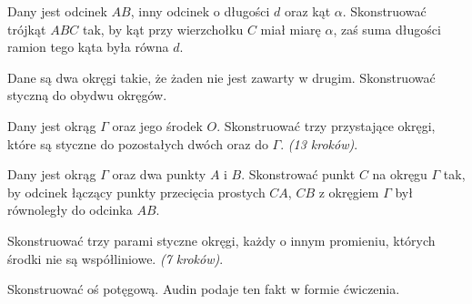 \begin{problem}
    Dany jest odcinek $AB$, inny odcinek o długości $d$ oraz kąt $\alpha$.
    Skonstruować trójkąt $ABC$ tak, by kąt przy wierzchołku $C$ miał miarę $\alpha$, zaś suma długości ramion tego kąta była równa $d$.
\end{problem} %

\begin{problem}
    Dane są dwa okręgi takie, że żaden nie jest zawarty w drugim.
    Skonstruować styczną do obydwu okręgów.
\end{problem}

\begin{problem}
    Dany jest okrąg $\Gamma$ oraz jego środek $O$.
    Skonstruować trzy przystające okręgi, które są styczne do pozostałych dwóch oraz do $\Gamma$. \hfill \emph{(13 kroków)}. %
\end{problem}

\begin{problem}
    Dany jest okrąg $\Gamma$ oraz dwa punkty $A$ i $B$.
    Skonstrować punkt $C$ na okręgu $\Gamma$ tak, by odcinek łączący punkty przecięcia prostych $CA$, $CB$ z okręgiem $\Gamma$ był równoległy do odcinka $AB$.
\end{problem}

\begin{problem}
    Skonstruować trzy parami styczne okręgi, każdy o innym promieniu, których środki nie są współliniowe. \hfill \emph{(7 kroków)}. %
\end{problem}

Skonstruować oś potęgową.
Audin \cite[s. 107]{audin_2003} podaje ten fakt w formie ćwiczenia.
